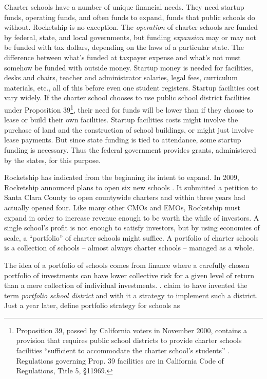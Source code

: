 Charter schools have a number of unique financial needs. They need startup funds, operating funds, and often funds to expand, funds that public schools do without. Rocketship is no exception. The \textit{operation} of charter schools are funded by federal, state, and local governments, but funding \textit{expansion} may or may not be funded with tax dollars, depending on the laws of a particular state. The difference between what's funded at taxpayer expense and what's not must somehow be funded with outside money. Startup money is needed for facilities, desks and chairs, teacher and administrator salaries, legal fees, curriculum materials, etc., all of this before even one student registers. Startup facilities cost vary widely. If the charter school chooses to use public school district facilities under Proposition 39\footnote{Proposition 39, passed by California voters in November 2000, contains a provision that requires public school districts to provide charter schools facilities ``sufficient to accommodate the charter school’s students'' \parencite[38—41]{sos.ca2000} \parencite{Prop39.2000}. Regulations governing Prop. 39 facilities are in California Code of Regulations, Title 5, §11969.}, their need for funds will be lower than if they choose to lease or build their own facilities. Startup facilities costs might involve the purchase of land and the construction of school buildings, or might just involve lease payments. But since state funding is tied to attendance, some startup funding is necessary. Thus the federal government provides grants, administered by the states, for this purpose.

Rocketship has indicated from the beginning its intent to expand. In 2009, Rocketship announced plans to open six new schools \parencite{Cook2009}. It submitted a petition to Santa Clara County to open countywide charters and within three years had actually opened four. Like many other CMOs and EMOs, Rocketship must expand in order to increase revenue enough to be worth the while of investors. A single school's profit is not enough to satisfy investors, but by using economies of scale, a ``portfolio'' of charter schools might suffice. A portfolio of charter schools is a collection of schools – almost always charter schools – managed as a whole.

The idea of a portfolio of schools comes from finance where a carefully chosen portfolio of investments can have lower collective risk for a given level of return than a mere collection of individual investments. \parencite[See ][for an overview of the mathematics of modern portfolio theory]{WikipediaMarkowitz2021}. \citeauthor{Hill.etal2009} claim to have invented the term \textit{portfolio school district} \parencite[1]{Hill.etal2009} and with it a strategy to implement such a district. Just a year later,  \citeauthor{Henig.etal2010} define portfolio strategy for schools as

